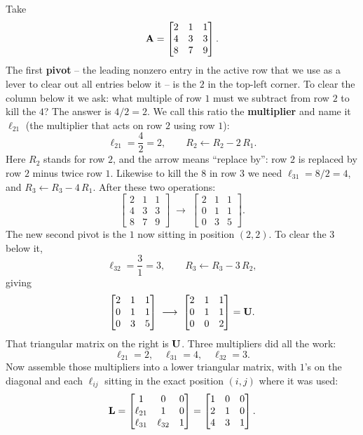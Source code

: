 Take
\[
  \mathbf{A} = \begin{bmatrix} 2 & 1 & 1 \\ 4 & 3 & 3 \\ 8 & 7 & 9 \end{bmatrix}.
\]
The first \textbf{pivot} -- the leading nonzero entry in the active row that we use as a lever
to clear out all entries below it -- is the $2$ in the top-left corner. To clear the column below
it we ask: what multiple of row $1$ must we subtract from row $2$ to kill the $4$? The answer is
$4/2 = 2$. We call this ratio the \textbf{multiplier} and name it $\ell_{21}$ (the multiplier that
acts on row $2$ using row $1$):
\[
  \ell_{21} = \frac{4}{2} = 2, \qquad
  R_2 \leftarrow R_2 - 2\,R_1.
\]
Here $R_2$ stands for row $2$, and the arrow means ``replace by'': row $2$ is replaced by
row $2$ minus twice row $1$.
Likewise to kill the $8$ in row $3$ we need $\ell_{31} = 8/2 = 4$, and
$R_3 \leftarrow R_3 - 4\,R_1$. After these two operations:
\[
  \begin{bmatrix} 2 & 1 & 1 \\ 4 & 3 & 3 \\ 8 & 7 & 9 \end{bmatrix}
  \;\longrightarrow\;
  \begin{bmatrix} 2 & 1 & 1 \\ 0 & 1 & 1 \\ 0 & 3 & 5 \end{bmatrix}.
\]
The new second pivot is the $1$ now sitting in position $(2,2)$. To clear the $3$ below it,
\[
  \ell_{32} = \frac{3}{1} = 3, \qquad R_3 \leftarrow R_3 - 3\,R_2,
\]
giving
\[
  \begin{bmatrix} 2 & 1 & 1 \\ 0 & 1 & 1 \\ 0 & 3 & 5 \end{bmatrix}
  \;\longrightarrow\;
  \begin{bmatrix} 2 & 1 & 1 \\ 0 & 1 & 1 \\ 0 & 0 & 2 \end{bmatrix} = \mathbf{U}.
\]
That triangular matrix on the right is $\mathbf{U}$. Three multipliers did all the work:
\[
  \ell_{21} = 2, \quad \ell_{31} = 4, \quad \ell_{32} = 3.
\]
Now assemble those multipliers into a lower triangular matrix, with
$1$'s on the diagonal and each $\ell_{ij}$ sitting in the exact position $(i,j)$ where it
was used:
\[
  \mathbf{L} = \begin{bmatrix} 1 & 0 & 0 \\ \ell_{21} & 1 & 0 \\ \ell_{31} & \ell_{32} & 1 \end{bmatrix}
          = \begin{bmatrix} 1 & 0 & 0 \\ 2 & 1 & 0 \\ 4 & 3 & 1 \end{bmatrix}.
\]
